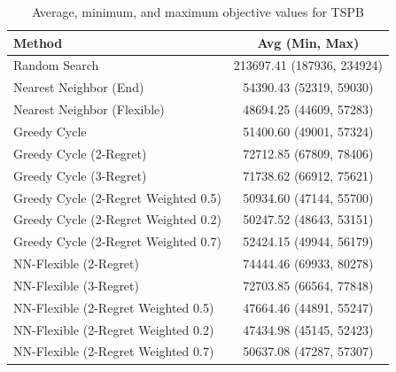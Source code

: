 \begin{table}[h!]
\centering
\begin{tabular}{lc}
\hline
Method & Avg (Min, Max) \\
\hline
Random Search & 213697.41 (187936, 234924) \\
Nearest Neighbor (End) & 54390.43 (52319, 59030) \\
Nearest Neighbor (Flexible) & 48694.25 (44609, 57283) \\
Greedy Cycle & 51400.60 (49001, 57324) \\
Greedy Cycle (2-Regret) & 72712.85 (67809, 78406) \\
Greedy Cycle (3-Regret) & 71738.62 (66912, 75621) \\
Greedy Cycle (2-Regret Weighted 0.5) & 50934.60 (47144, 55700) \\
Greedy Cycle (2-Regret Weighted 0.2) & 50247.52 (48643, 53151) \\
Greedy Cycle (2-Regret Weighted 0.7) & 52424.15 (49944, 56179) \\
NN-Flexible (2-Regret) & 74444.46 (69933, 80278) \\
NN-Flexible (3-Regret) & 72703.85 (66564, 77848) \\
NN-Flexible (2-Regret Weighted 0.5) & 47664.46 (44891, 55247) \\
NN-Flexible (2-Regret Weighted 0.2) & 47434.98 (45145, 52423) \\
NN-Flexible (2-Regret Weighted 0.7) & 50637.08 (47287, 57307) \\
\hline
\end{tabular}
\caption{Average, minimum, and maximum objective values for TSPB}
\label{tab:TSPB_results}
\end{table}
